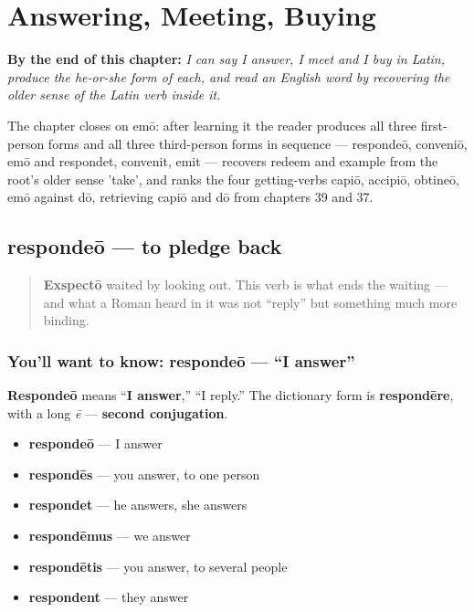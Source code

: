 
\chapter{Answering, Meeting, Buying}
\label{ch:la-answering-meeting-buying}

\begin{chapteropening}
\textbf{By the end of this chapter:} \emph{I can say I answer, I meet and I buy in Latin, produce the he-or-she form of each, and read an English word by recovering the older sense of the Latin verb inside it.}

The chapter closes on emō: after learning it the reader produces all three first-person forms and all three third-person forms in sequence — respondeō, conveniō, emō and respondet, convenit, emit — recovers redeem and example from the root's older sense 'take', and ranks the four getting-verbs capiō, accipiō, obtineō, emō against dō, retrieving capiō and dō from chapters 39 and 37.
\end{chapteropening}

\section[respondeō, respondēre]{respondeō — to pledge back}

\label{lesson:LA-C43-respondeo}



\begin{quote}
\textbf{Exspectō} waited by looking out. This verb is what ends the waiting — and what a Roman heard in it was not \textquotedblleft{}reply\textquotedblright{} but something much more binding.
\end{quote}

\subsection*{You'll want to know: respondeō — \textquotedblleft{}I answer\textquotedblright{}}
\textbf{Respondeō} means \textquotedblleft{}\textbf{I answer},\textquotedblright{} \textquotedblleft{}I reply.\textquotedblright{} The dictionary form is \textbf{respondēre}, with a long \emph{ē} — \textbf{second conjugation}.

\begin{itemize}
\raggedright
  \item \textbf{respondeō} — I answer
  \item \textbf{respondēs} — you answer, to one person
  \item \textbf{respondet} — he answers, she answers
  \item \textbf{respondēmus} — we answer
  \item \textbf{respondētis} — you answer, to several people
  \item \textbf{respondent} — they answer
\end{itemize}

